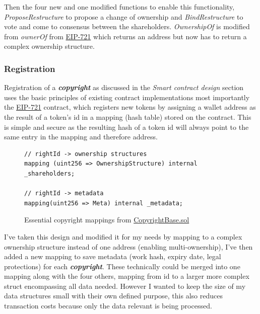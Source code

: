 \documentclass[12pt]{article}
\newcommand{\keyword}[1]{\textbf{\textit{#1}}}
\newcommand{\nft}[0]{\href{https://eips.ethereum.org/EIPS/eip-721}{EIP-721} }
\begin{document}
Then the four new and one modified functions to enable this functionality, \textit{ProposeRestructure} to propose a change of ownership and \textit{BindRestructure} to vote and come to consensus between the shareholders. \textit{OwnershipOf} is modified from \textit{ownerOf} from \nft which returns an address but now has to return a complex ownership structure.

\subsubsection{Registration}

Registration of a \keyword{copyright} as discussed in the \textit{Smart contract design} section uses the basic principles of existing contract implementations most importantly the \nft contract, which registers new tokens by assigning a wallet address as the result of a token's id in a mapping (hash table) stored on the contract. This is simple and secure as the resulting hash of a token id will always point to the same entry in the mapping and therefore address.

\begin{figure}[H]
\caption{Essential copyright mappings from \href{https://github.com/MrHarrisonBarker/CRPL/blob/main/CRPL.Contracts/contracts/Copyrights/CopyrightBase.sol}{CopyrightBase.sol}}
\centering
\begin{lstlisting}[language=Solidity]
// rightId -> ownership structures
mapping (uint256 => OwnershipStructure) internal _shareholders;
    
// rightId -> metadata
mapping(uint256 => Meta) internal _metadata;
\end{lstlisting}
\end{figure}

I've taken this design and modified it for my needs by mapping to a complex ownership structure instead of one address (enabling multi-ownership), I've then added a new mapping to save metadata (work hash, expiry date, legal protections) for each \keyword{copyright}. These technically could be merged into one mapping along with the four others, mapping from id to a larger more complex struct encompassing all data needed. However I wanted to keep the size of my data structures small with their own defined purpose, this also reduces transaction costs because only the data relevant is being processed.
\end{document}
